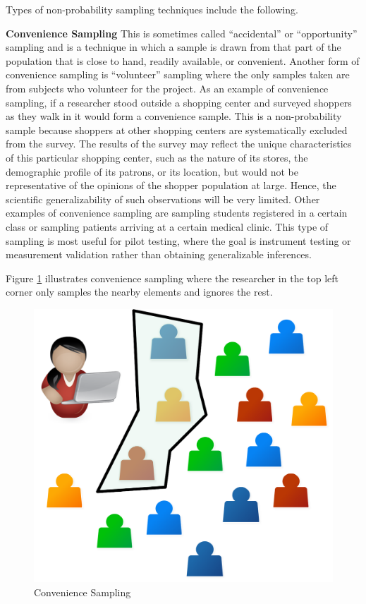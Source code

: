 Types of non-probability sampling techniques include the following.

\textbf{Convenience Sampling} This is sometimes called ``accidental'' or ``opportunity'' sampling and is a technique in which a sample is drawn from that part of the population that is close to hand, readily available, or convenient. Another form of convenience sampling is ``volunteer'' sampling where the only samples taken are from subjects who volunteer for the project. As an example of convenience sampling, if a researcher stood outside a shopping center and surveyed shoppers as they walk in it would form a convenience sample. This is a non-probability sample because shoppers at other shopping centers are systematically excluded from the survey. The results of the survey may reflect the unique characteristics of this particular shopping center, such as the nature of its stores, the demographic profile of its patrons, or its location, but would not be representative of the opinions of the shopper population at large. Hence, the scientific generalizability of such observations will be very limited. Other examples of convenience sampling are sampling students registered in a certain class or sampling patients arriving at a certain medical clinic. This type of sampling is most useful for pilot testing, where the goal is instrument testing or measurement validation rather than obtaining generalizable inferences.

Figure \ref{07:fig07} illustrates convenience sampling where the researcher in the top left corner only samples the nearby elements and ignores the rest.

\begin{figure}[H]
	\centering
	\includegraphics[width=\maxwidth{.35\linewidth}]{gfx/07-07}
	\caption{Convenience Sampling}
	\label{07:fig07}
\end{figure}

